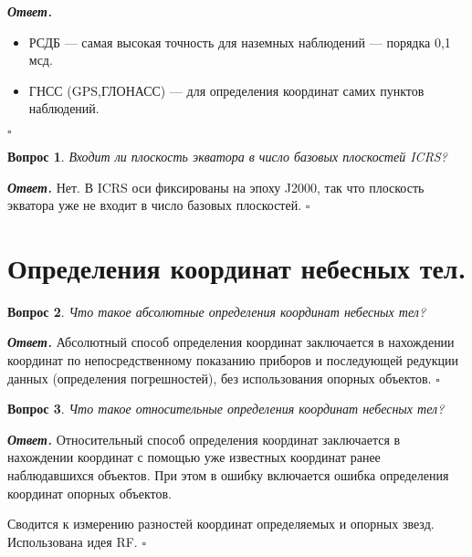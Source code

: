\documentclass[12pt]{article}
\newtheorem{problem}{Вопрос}
\newenvironment{solution}[1][\it{Ответ}]{\textbf{#1. } }{$\square$}
\begin{document}
	\begin{solution}
		\begin{itemize}
			\item РСДБ — самая высокая точность для наземных наблюдений — порядка 0,1 мсд.
			\item ГНСС (GPS,ГЛОНАСС) — для определения координат самих пунктов наблюдений.
		\end{itemize}
	\end{solution}
	
	\begin{problem}
	Входит ли плоскость экватора в число базовых плоскостей ICRS?
\end{problem}

\begin{solution}
	Нет. В ICRS оси фиксированы на эпоху J2000, так что плоскость экватора уже не входит
	в число базовых плоскостей.
\end{solution}
	
	
\section{Определения координат небесных тел.}
	
	\begin{problem}
		Что такое абсолютные определения координат небесных тел?
	\end{problem}
	
	\begin{solution}
		Абсолютный способ определения координат заключается в нахождении координат по непосредственному показанию приборов и последующей редукции данных (определения погрешностей), без использования опорных объектов.
	\end{solution}
	
	\begin{problem}
		Что такое относительные определения координат небесных тел?
	\end{problem}
	
	\begin{solution}
		Относительный способ определения координат заключается в нахождении координат с
		помощью уже известных координат ранее наблюдавшихся объектов. При этом в ошибку
		включается ошибка определения координат опорных объектов.
		
		Сводится к измерению разностей координат определяемых и опорных звезд. Использована идея RF.
	\end{solution}
	
	
	
\end{document}
